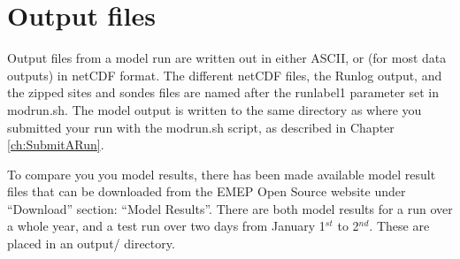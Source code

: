 \chapter{Output files}
\label{ch:output}

Output files from a model run are written out in either ASCII, or
(for most data outputs) in netCDF format. 
The different netCDF files, the Runlog output, and the zipped sites and sondes 
files are named after the runlabel1 parameter set in modrun.sh. 
The model output is written to the same directory as where you submitted 
your run with the modrun.sh script, as described in Chapter \ref{ch:SubmitARun}.

To compare you you model results, there has been made available model result files 
that can be downloaded  from the EMEP Open Source website under ``Download'' section: ``Model Results''. 
There are both model results for a run over a whole year, and a test run over two days from 
January 1$^{st}$ to 2$^{nd}$. These are placed in an output/ directory. 
 


